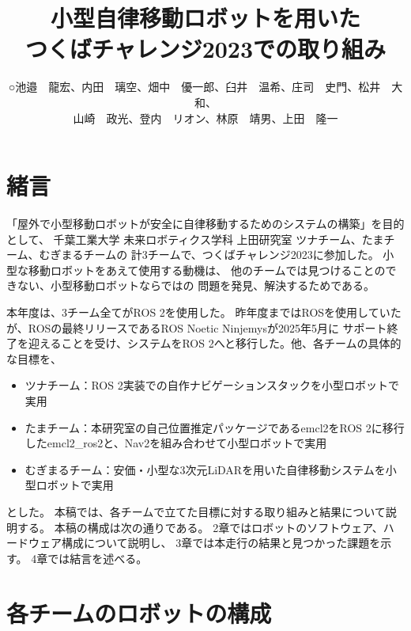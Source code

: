 \documentclass[twocolumn,9pt]{jsproceedings}
\title{小型自律移動ロボットを用いた\\つくばチャレンジ2023での取り組み}
\author{○池邉　龍宏\authorrefmark{2}、内田　璃空\authorrefmark{2}、畑中　優一郎\authorrefmark{1}、臼井　温希\authorrefmark{1}、庄司　史門\authorrefmark{1}、松井　大和\authorrefmark{1}、\\
山崎　政光\authorrefmark{1}、登内　リオン\authorrefmark{1}、林原　靖男\authorrefmark{1}、上田　隆一\authorrefmark{1}}
\affiliation{千葉工業大学 未来ロボティクス学科 ツナチーム/たまチーム/むぎまるチーム}
\begin{document}
\maketitle


\section{緒言}

「屋外で小型移動ロボットが安全に自律移動するためのシステムの構築」を目的として、
千葉工業大学 未来ロボティクス学科 上田研究室 ツナチーム、たまチーム、むぎまるチームの
計3チームで、つくばチャレンジ2023に参加した。
小型な移動ロボットをあえて使用する動機は、
他のチームでは見つけることのできない、小型移動ロボットならではの
問題を発見、解決するためである。

本年度は、3チーム全てがROS 2を使用した。
昨年度まではROSを使用していたが、ROSの最終リリースであるROS Noetic Ninjemysが2025年5月に
サポート終了を迎えることを受け、システムをROS 2へと移行した。他、各チームの具体的な目標を、

\begin{itemize}
  \item ツナチーム：ROS 2実装での自作ナビゲーションスタックを小型ロボットで実用
  \item たまチーム：本研究室の自己位置推定パッケージであるemcl2\cite{emcl2}をROS 2に移行したemcl2\_ros2\cite{emcl2_ros2}と、Nav2を組み合わせて小型ロボットで実用
  \item むぎまるチーム：安価・小型な3次元LiDARを用いた自律移動システムを小型ロボットで実用
\end{itemize}
とした。
本稿では、各チームで立てた目標に対する取り組みと結果について説明する。
本稿の構成は次の通りである。
2章ではロボットのソフトウェア、ハードウェア構成について説明し、
3章では本走行の結果と見つかった課題を示す。
4章では結言を述べる。

\section{各チームのロボットの構成}
\end{document}
